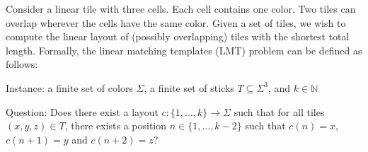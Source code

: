 Consider a linear tile with three cells. Each cell contains one color. Two
tiles can overlap wherever the cells have the same color. Given a set of tiles,
we wish to compute the linear layout of (possibly overlapping) tiles with the
shortest total length. Formally, the linear matching templates (LMT) problem
can be defined as follows:

\begin{shaded}
\begin{definition}\mbox{}

  Instance: a finite set of colors $\Sigma$, a finite set of sticks
  $T\subseteq\Sigma^3$, and $k\in\mathbb{N}$

  Question: Does there exist a layout $c\colon\{1,\ldots,k\}\to\Sigma$ such
  that for all tiles $(x, y, z)\in T$, there exists a position
  $n\in\{1,\ldots,k-2\}$ such that $c(n)=x$, $c(n+1)=y$ and $c(n+2)=z$?
\end{definition}
\end{shaded}
